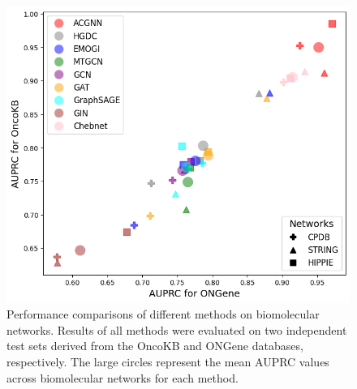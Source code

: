 \begin{figure}[ht]
	\centering
		\scriptsize
	\captionsetup{font=footnotesize}
	\includegraphics[width=0.45 \textwidth]{images/__comp_oncokb_ongene_acgnn.png}
	\caption{Performance comparisons of different methods on biomolecular networks. Results of all methods were evaluated on two independent test sets derived from the OncoKB and ONGene databases, respectively. The large circles represent the mean AUPRC values across biomolecular networks for each method.}
	\label{fig11}
\end{figure}



